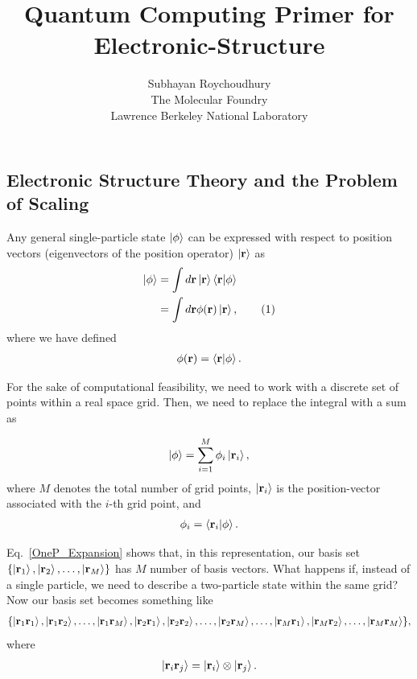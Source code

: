 \documentclass[12pt,oneside]{book}
\title{Quantum Computing Primer for Electronic-Structure}
\author{Subhayan Roychoudhury\\ The Molecular Foundry\\ Lawrence Berkeley National Laboratory}
\date{}
\newcommand\numberthis{\addtocounter{equation}{1}\tag{\theequation}}
\begin{document}
\maketitle

\subsection*{Electronic Structure Theory and the Problem of Scaling}

Any general single-particle state $\ket{\phi}$ can be expressed with respect to position vectors (eigenvectors of the position operator) $\ket{\mathbf{r}}$ as
\begin{align*}
    \ket{\phi} &{}= \int d \mathbf{r} \ket{\mathbf{r}}\braket{\mathbf{r}|\phi}\\
    &{} = \int d\mathbf{r} \phi(\mathbf{r})\ket{\mathbf{r}}, \numberthis
\end{align*}
where we have defined
\begin{align}
    \phi(\mathbf{r})= \braket{\mathbf{r}|\phi}.
\end{align}

For the sake of computational feasibility, we need to work with a discrete set of points within a real space grid. Then, we need to replace the integral with a sum as

\begin{align}\label{OneP_Expansion}
    \ket{\phi} = \sum_{i=1}^M \phi_i \ket{\mathbf{r}_i},
\end{align}
where $M$ denotes the total number of grid points, $\ket{\mathbf{r}_i}$ is the position-vector associated with the $i$-th grid point, and 
\begin{align}
    \phi_i=\braket{\mathbf{r}_i|\phi}.
\end{align}

Eq.~\ref{OneP_Expansion} shows that, in this representation, our basis set $\{\ket{\mathbf{r}_1}, \ket{\mathbf{r}_2},\hdots, \ket{\mathbf{r}_M}\}$ has $M$ number of basis vectors. What happens if, instead of a single particle, we need to describe a two-particle state within the same grid? Now our basis set becomes something like
\begin{align*}
    \{\ket{\mathbf{r}_1\mathbf{r}_1}, \ket{\mathbf{r}_1\mathbf{r}_2} , \hdots , \ket{\mathbf{r}_1\mathbf{r}_M}, \ket{\mathbf{r}_2\mathbf{r}_1} , \ket{\mathbf{r}_2\mathbf{r}_2}, \hdots , \ket{\mathbf{r}_2\mathbf{r}_M}, \hdots , \ket{\mathbf{r}_M\mathbf{r}_1}, \ket{\mathbf{r}_M\mathbf{r}_2}, \hdots , \ket{\mathbf{r}_M\mathbf{r}_M}\},
\end{align*}
where 
\begin{align*}
\ket{\mathbf{r}_i \mathbf{r}_j} = \ket{\mathbf{r}_i}\otimes\ket{\mathbf{r}_j}.
\end{align*}
\end{document}
